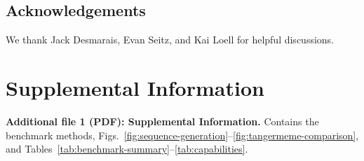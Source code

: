 \documentclass[pdflatex,sn-vancouver-num,referee,oneside]{sn-jnl}
\begin{document}
\subsection*{Acknowledgements}
We thank Jack Desmarais, Evan Seitz, and Kai Loell for helpful discussions.

\section*{Supplemental Information}

\textbf{Additional file 1 (PDF): Supplemental Information.}
Contains the benchmark methods, Figs.~\ref{fig:sequence-generation}--\ref{fig:tangermeme-comparison}, and Tables~\ref{tab:benchmark-summary}--\ref{tab:capabilities}.


\end{document}
